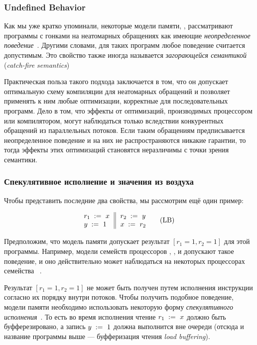 \subsubsection{Undefined Behavior}
\label{sec:background:ub}

Как мы уже кратко упоминали, некоторые модели памяти,
\eg \CPP, рассматривают программы с гонками 
на неатомарных обращениях как имеющие 
\emph{неопределенное поведение}~\cite{Boehm-Adve:PLDI08}.
Другими словами, для таких программ любое поведение считается допустимым. 
Это свойство также иногда называется 
\emph{загорающейся семантикой} (\emph{catch-fire semantics})
 
Практическая польза такого подхода заключается в том,
что он допускает оптимальную схему компиляции для 
неатомарных обращений и позволяет применять к ним 
любые оптимизации, корректные для последовательных программ.
Дело в том, что эффекты от оптимизаций, производимых 
процессором или компилятором, могут наблюдаться 
только вследствии конкурентных обращений 
из параллельных потоков. Если таким обращениям 
предписывается неопределенное поведение и на них 
не распространяются никакие гарантии, 
то тогда эффекты этих оптимизаций 
становятся неразличимы с точки зрения семантики. 
 
\subsubsection{Спекулятивное исполнение и значения из воздуха}
\label{sec:background:oota}

Чтобы представить последние два свойства, мы рассмотрим ещё один пример:

\begin{equation*}
\inarrII{
  \readInst{}{r_1}{x}     \\
  \writeInst{}{y}{1}      \\
}{
  \readInst{}{r_2}{y}     \\
  \writeInst{}{x}{r_2}    \\
}
\tag{LB}\label{ex:lb}
\end{equation*}

Предположим, что модель памяти допускает 
результат ${[r_1=1, r_2=1]}$ для этой программы. 
Например, модели семейств процессоров 
, , и \POWER
допускают такое поведение, 
и оно действительно может наблюдаться 
на некоторых процессорах семейства 
~\cite{Maranget-al:Tutorial2012}.

Результат ${[r_1=1, r_2=1]}$ не может быть получен 
путем исполнения инструкции согласно их порядку внутри потоков.
Чтобы получить подобное поведение, 
модели памяти необходимо использовать 
некоторую форму \emph{спекулятивного исполнения}~\cite{Boudol-Petri:ESOP10, Boehm-Demsky:MSPC14}.
То есть во время исполнения чтение $r_1\;:=_{}\;x$
должно быть буфферезировано, а запись $y\;:=_{}\;1$ 
должна выполнится вне очереди 
(отсюда и название программы выше --- 
буфферизация чтения \emph{load buffering}).

